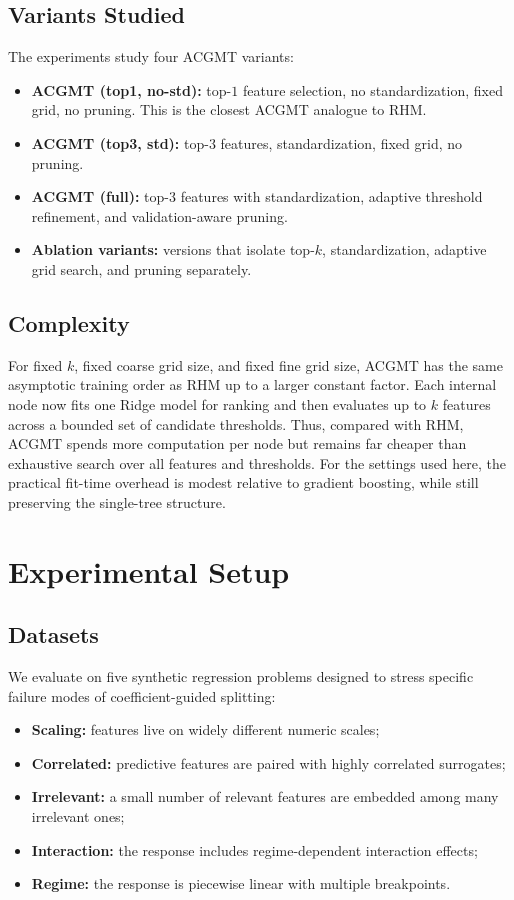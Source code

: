 \documentclass[11pt,a4paper]{article}
\begin{document}
\subsection{Variants Studied}

The experiments study four ACGMT variants:
\begin{itemize}
    \item \textbf{ACGMT (top1, no-std):} top-$1$ feature selection, no standardization, fixed grid, no pruning. This is the closest ACGMT analogue to RHM.
    \item \textbf{ACGMT (top3, std):} top-$3$ features, standardization, fixed grid, no pruning.
    \item \textbf{ACGMT (full):} top-$3$ features with standardization,
    adaptive threshold refinement, and validation-aware pruning.
    \item \textbf{Ablation variants:} versions that isolate top-$k$, standardization, adaptive grid search, and pruning separately.
\end{itemize}

\subsection{Complexity}

For fixed $k$, fixed coarse grid size, and fixed fine grid size, ACGMT has the same asymptotic training order as RHM up to a larger constant factor. Each internal node now fits one Ridge model for ranking and then evaluates up to $k$ features across a bounded set of candidate thresholds. Thus, compared with RHM, ACGMT spends more computation per node but remains far cheaper than exhaustive search over all features and thresholds. For the settings used here, the practical fit-time overhead is modest relative to gradient boosting, while still preserving the single-tree structure.

\section{Experimental Setup}\label{sec:experiments}

\subsection{Datasets}

We evaluate on five synthetic regression problems designed to stress specific failure modes of coefficient-guided splitting:
\begin{itemize}
    \item \textbf{Scaling:} features live on widely different numeric scales;
    \item \textbf{Correlated:} predictive features are paired with highly correlated surrogates;
    \item \textbf{Irrelevant:} a small number of relevant features are embedded among many irrelevant ones;
    \item \textbf{Interaction:} the response includes regime-dependent interaction effects;
    \item \textbf{Regime:} the response is piecewise linear with multiple breakpoints.
\end{itemize}
\end{document}
